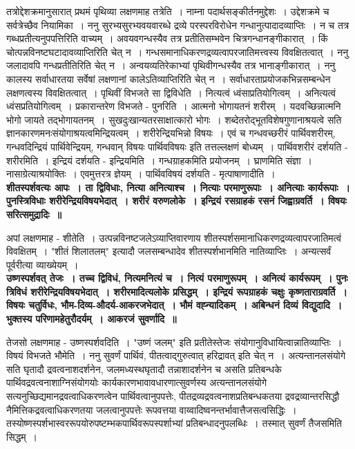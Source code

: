 		तत्रोद्देशक्रमानुसारात् प्रथमं पृथिव्या लक्षणमाह तत्रेति~। नाम्ना पदार्थसङ्कीर्तनमुद्देशः~। उद्देशक्रमे च सर्वत्रेच्छैव नियामिका~। ननु सुरभ्यसुरभ्यवयवारब्धे द्रव्ये परस्परविरोधेन गन्धानुत्पादादव्याप्तिः~। न च तत्र गब्धप्रतीत्यनुपपत्तिरिति वाच्यम्~। अवयवगन्धस्यैव तत्र प्रतीतिसम्भवेन चित्रगन्धानङ्गीकारात्~। किं चोत्पन्नविनष्टघटादावव्याप्तिरिति चेत् न~। गन्धसमानाधिकरणद्रव्यत्वापरजातिमत्त्वस्य विवक्षितत्वात्~। ननु जलादावपि गन्धप्रतीतिरिति चेत् न~। अन्वयव्यतिरेकाभ्यां पृथिवीगन्धस्यैव तत्र भानाङ्गीकारात्~। ननु कालस्य सर्वाधारतया सर्वेषां लक्षणानां कालेऽतिव्याप्तिरिति चेत् न~। सर्वाधारताप्रयोजकभिन्नसम्बन्धेन लक्षणत्वस्य विवक्षितत्वात्~। पृथिवीं विभजते सा द्विविधेति~। नित्यत्वं ध्वंसाप्रतियोगित्वम्~। अनित्यत्वं ध्वंसप्रतियोगित्वम्~। प्रकारान्तरेण विभजते - पुनरिति~। आत्मनो भोगायतनं शरीरम्~। यदवच्छिन्नात्मनि भोगो जायते तद्भोगायतनम्~। सुखदुःखान्यतरसाक्षात्कारो भोगः~। शब्देतरोद्भूतविशेषगुणानाश्रयत्वे सति ज्ञानकारणमनःसंयोगाश्रयत्वमिन्द्रियत्वम्~। शरीरेन्द्रियभिन्नो विषयः~। एवं च गन्धवच्छरीरं पार्थिवशरीरम्, गन्धवदिन्द्रियं पार्थिवेन्द्रियम्, गन्धवान् विषयः पार्थिवविषयः इति तत्तल्लक्षणं बोध्यम्~। पार्थिवशरीरं दर्शयति - शरीरमिति~। इन्द्रियं दर्शयति - इन्द्रियमिति~। गन्धग्राहकमिति प्रयोजनम्~। घ्राणमिति संज्ञा~। नासाग्रेत्याश्रयोक्तिः~। एवमुत्तरत्र ज्ञेयम्~। पार्थिवविषयं दर्शयति - मृत्पाषाणादीति~।\\[10pt]
	{\bfseries शीतस्पर्शवत्यः आपः~। ता द्विविधाः, नित्या अनित्याश्च~। नित्याः परमाणुरूपाः~। अनित्याः कार्यरूपाः~। पुनस्त्रिविधाः शरीरेन्द्रियविषयभेदात्~। शरीरं वरुणलोके~। इन्द्रियं रसग्राहकं रसनं जिह्वाग्रवर्ति~। विषयः सरित्समुद्रादिः~॥}\par
		अपां लक्षणमाह - शीतेति~। उत्पन्नविनष्टजलेऽव्याप्तिवारणाय शीतस्पर्शसमानाधिकरणद्रव्यत्वापरजातिमत्वं विवक्षितम्~। "शीतं शिलातलम्" इत्यादौ जलसम्बन्धादेव शीतस्पर्शभानमिति नातिव्याप्तिः~। अन्यत्सर्वं पूर्वरीत्या व्याख्येयम्~।\\[10pt]
	{\bfseries उष्णस्पर्शवत् तेजः~। तच्च द्विविधं, नित्यमनित्यं च~। नित्यं परमाणुरूपम्~। अनित्यं कार्यरूपम्~। पुनः त्रिविधं शरीरेन्द्रियविषयभेदात्~। शरीरमादित्यलोके प्रसिद्धम्~। इन्द्रियं रूपग्राहकं चक्षुः कृष्णताराग्रवर्ति~। विषयः चतुर्विधः, भौम-दिव्य-औदर्य-आकरजभेदात्~। भौमं वह्न्यादिकम्~। अबिन्धनं दिव्यं विद्युदादि~। भुक्तस्य परिणामहेतुरौदर्यम्~। आकरजं सुवर्णादि~॥}\par
		तेजसो लक्षणमाह - उष्णस्पर्शवदिति~। "उष्णं जलम्" इति प्रतीतेस्तेजः संयोगानुविधायित्वान्नातिव्याप्तिः~। विषयं विभजते भौमेति~। ननु सुवर्णं पार्थिवं, पीतत्वाद्गुरुत्वात् हरिद्रावत् इति चेत् न~। अत्यन्तानलसंयोगे सति घृतादौ द्रवत्वनाशदर्शनेन, जलमध्यस्थघृतादौ तन्नाशादर्शनेन च असति प्रतिबन्धके पार्थिवद्रवत्वनाशाग्निसंयोगयोः कार्यकारणभावावधारणात्सुवर्णस्य अत्यन्तानलसंयोगे सत्यनुच्छिद्यमानद्रवत्वाधिकरणत्वेन पार्थिवत्वानुपपत्तेः, पीतद्रव्यद्रवत्वनाशप्रतिबन्धकतया द्रवद्रव्यान्तरसिद्धौ नैमित्तिकद्रवत्वाधिकरणतया जलत्वानुपपत्तेः रूपवत्तया वाय्वादिष्वनन्तर्भावात्तैजसत्वसिद्धिः~। तस्योष्णस्पर्शभास्वररूपयोरुपष्टम्भकपार्थिवरूपस्पर्शाभ्यां प्रतिबन्धादनुपलब्धिः~। तस्मात् सुवर्णं तैजसमिति सिद्धम्~।\\[10pt]
